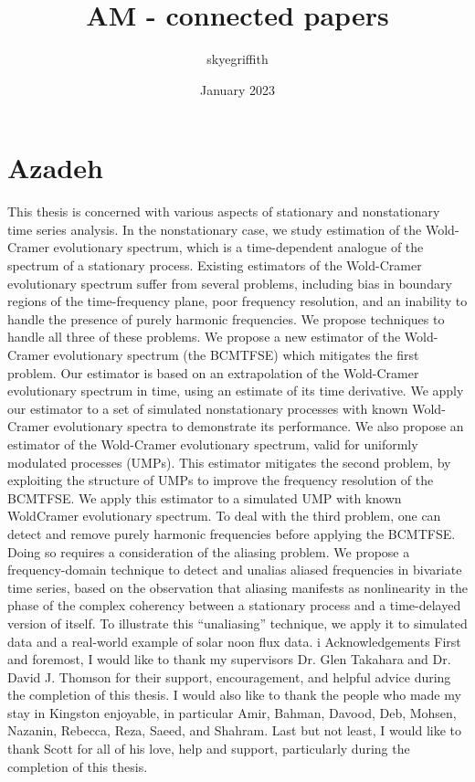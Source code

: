 \documentclass{article}
\title{AM - connected papers}
\author{skyegriffith }
\date{January 2023}
\begin{document}
{\section{Azadeh}}

This thesis is concerned with various aspects of stationary and nonstationary time series analysis. In the nonstationary case, we study estimation of the Wold-Cramer evolutionary spectrum, which is a time-dependent analogue of the spectrum of a stationary process. Existing estimators of the Wold-Cramer evolutionary spectrum suffer from several problems, including bias in boundary regions of the time-frequency plane, poor frequency resolution, and an inability to handle the presence of purely harmonic frequencies. We propose techniques to handle all three of these problems. We propose a new estimator of the Wold-Cramer evolutionary spectrum (the BCMTFSE) which mitigates the first problem. Our estimator is based on an extrapolation of the Wold-Cramer evolutionary spectrum in time, using an estimate of its time derivative. We apply our estimator to a set of simulated nonstationary processes with known Wold-Cramer evolutionary spectra to demonstrate its performance. We also propose an estimator of the Wold-Cramer evolutionary spectrum, valid for uniformly modulated processes (UMPs). This estimator mitigates the second problem, by exploiting the structure of UMPs to improve the frequency resolution of the BCMTFSE. We apply this estimator to a simulated UMP with known WoldCramer evolutionary spectrum. To deal with the third problem, one can detect and remove purely harmonic frequencies before applying the BCMTFSE. Doing so requires a consideration of the aliasing problem. We propose a frequency-domain technique to detect and unalias aliased frequencies in bivariate time series, based on the observation that aliasing manifests as nonlinearity in the phase of the complex coherency between a stationary process and a time-delayed version of itself. To illustrate this “unaliasing” technique, we apply it to simulated data and a real-world example of solar noon flux data. i Acknowledgements First and foremost, I would like to thank my supervisors Dr. Glen Takahara and Dr. David J. Thomson for their support, encouragement, and helpful advice during the completion of this thesis. I would also like to thank the people who made my stay in Kingston enjoyable, in particular Amir, Bahman, Davood, Deb, Mohsen, Nazanin, Rebecca, Reza, Saeed, and Shahram. Last but not least, I would like to thank Scott for all of his love, help and support, particularly during the completion of this thesis. \\[10pt]
\end{document}

